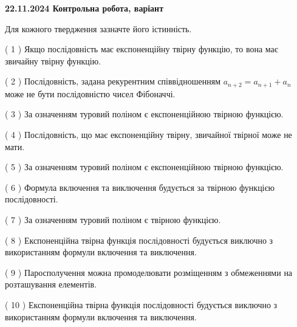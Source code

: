 \documentclass[12pt, ukrainian]{article}
\begin{document}
\vspace{4mm}
\newpage
\begin {large}

\textbf{22.11.2024 Контрольна робота, варіант  }\par


{
Для кожного твердження зазначте його істинність.\par
\vspace{2mm}
( 1 ) Якщо послідовність має експоненційну твірну функцію, то вона має звичайну твірну функцію.%

( 2 ) Послідовність, задана рекурентним співвідношенням $a_{n+2}=a_{n+1}+a_{n}$ може не бути послідовністю чисел Фібоначчі.%

( 3 ) За означенням туровий поліном є експоненційною твірною функцією.%

( 4 ) Послідовність, що має експоненційну твірну, звичайної твірної може не мати.%

( 5 ) За означенням туровий поліном є експоненційною твірною функцією.%

( 6 ) Формула включення та виключення будується за твірною функцією послідовності.%

( 7 ) За означенням туровий поліном є твірною функцією.%

( 8 ) Експоненційна твірна функція послідовності будується виключно з використанням формули включення та виключення.%

( 9 ) Паросполучення можна промоделювати розміщенням з обмеженнями на розташування елементів.%

( 10 ) Експоненційна твірна функція послідовності будується виключно з використанням формули включення та виключення.%


\vspace{5mm}
}
\end {large}
\end{document}
